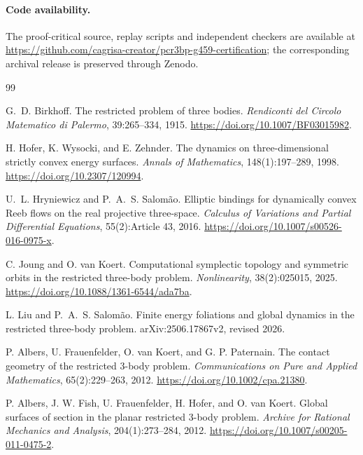 \documentclass[11pt]{article}
\begin{document}
\paragraph{Code availability.} The proof-critical source, replay scripts and independent checkers are available at \url{https://github.com/cagrisa-creator/pcr3bp-g459-certification}; the corresponding archival release is preserved through Zenodo.

\begin{thebibliography}{99}

G.~D. Birkhoff.
\newblock The restricted problem of three bodies.
\newblock \emph{Rendiconti del Circolo Matematico di Palermo}, 39:265--334, 1915.
\newblock \url{https://doi.org/10.1007/BF03015982}.

H. Hofer, K. Wysocki, and E. Zehnder.
\newblock The dynamics on three-dimensional strictly convex energy surfaces.
\newblock \emph{Annals of Mathematics}, 148(1):197--289, 1998.
\newblock \url{https://doi.org/10.2307/120994}.

U.~L. Hryniewicz and P.~A.~S. Salom\~ao.
\newblock Elliptic bindings for dynamically convex Reeb flows on the real projective three-space.
\newblock \emph{Calculus of Variations and Partial Differential Equations}, 55(2):Article 43, 2016.
\newblock \url{https://doi.org/10.1007/s00526-016-0975-x}.

C. Joung and O. van Koert.
\newblock Computational symplectic topology and symmetric orbits in the restricted three-body problem.
\newblock \emph{Nonlinearity}, 38(2):025015, 2025.
\newblock \url{https://doi.org/10.1088/1361-6544/ada7ba}.

L. Liu and P.~A.~S. Salom\~ao.
\newblock Finite energy foliations and global dynamics in the restricted three-body problem.
\newblock arXiv:2506.17867v2, revised 2026.


P. Albers, U. Frauenfelder, O. van Koert, and G. P. Paternain.
\newblock The contact geometry of the restricted 3-body problem.
\newblock \emph{Communications on Pure and Applied Mathematics}, 65(2):229--263, 2012.
\newblock \url{https://doi.org/10.1002/cpa.21380}.

P. Albers, J. W. Fish, U. Frauenfelder, H. Hofer, and O. van Koert.
\newblock Global surfaces of section in the planar restricted 3-body problem.
\newblock \emph{Archive for Rational Mechanics and Analysis}, 204(1):273--284, 2012.
\newblock \url{https://doi.org/10.1007/s00205-011-0475-2}.


\end{thebibliography}
\end{document}
